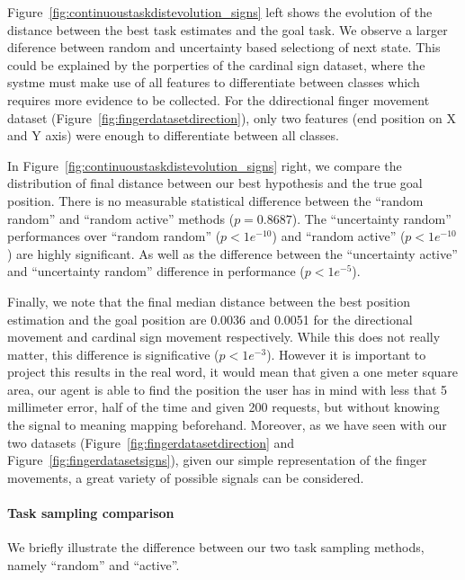 Figure~\ref{fig:continuoustaskdistevolution_signs} left shows the evolution of the distance between the best task estimates and the goal task. We observe a larger diference between random and uncertainty based selectiong of next state. This could be explained by the porperties of the cardinal sign dataset, where the systme must make use of all features to differentiate between classes which requires more evidence to be collected. For the ddirectional finger movement dataset (Figure~\ref{fig:fingerdatasetdirection}), only two features (end position on X and Y axis) were enough to differentiate between all classes.

In Figure~\ref{fig:continuoustaskdistevolution_signs} right, we compare the distribution of final distance between our best hypothesis and the true goal position. There is no measurable statistical difference between the ``random random'' and ``random active'' methods ($p = 0.8687$). The ``uncertainty random'' performances over ``random random'' ($p<1e^{-10}$) and ``random active'' ($p<1e^{-10}$) are highly significant. As well as the difference between the ``uncertainty active'' and ``uncertainty random'' difference in performance ($p<1e^{-5}$).

Finally, we note that the final median distance between the best position estimation and the goal position are 0.0036 and 0.0051 for the directional movement and cardinal sign movement respectively. While this does not really matter, this difference is significative ($p< 1e^{-3}$). However it is important to project this results in the real word, it would mean that given a one meter square area, our agent is able to find the position the user has in mind with less that 5 millimeter error, half of the time and given 200 requests, but without knowing the signal to meaning mapping beforehand. Moreover, as we have seen with our two datasets (Figure~\ref{fig:fingerdatasetdirection} and Figure~\ref{fig:fingerdatasetsigns}), given our simple representation of the finger movements, a great variety of possible signals can be considered.

\paragraph{Task sampling comparison}

We briefly illustrate the difference between our two task sampling methods, namely ``random'' and ``active''.

